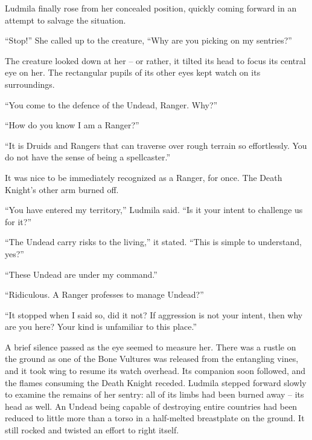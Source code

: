  

Ludmila finally rose from her concealed position, quickly coming forward in an attempt to salvage the situation.

 

“Stop!” She called up to the creature, “Why are you picking on my sentries?”

 

The creature looked down at her – or rather, it tilted its head to focus its central eye on her. The rectangular pupils of its other eyes kept watch on its surroundings.

 

“You come to the defence of the Undead, Ranger. Why?”

 

“How do you know I am a Ranger?”

 

“It is Druids and Rangers that can traverse over rough terrain so effortlessly. You do not have the sense of being a spellcaster.”

 

It was nice to be immediately recognized as a Ranger, for once. The Death Knight’s other arm burned off.

 

“You have entered my territory,” Ludmila said. “Is it your intent to challenge us for it?”

 

“The Undead carry risks to the living,” it stated. “This is simple to understand, yes?”

 

“These Undead are under my command.”

 

“Ridiculous. A Ranger professes to manage Undead?”

 

“It stopped when I said so, did it not? If aggression is not your intent, then why are you here? Your kind is unfamiliar to this place.”

 

A brief silence passed as the eye seemed to measure her. There was a rustle on the ground as one of the Bone Vultures was released from the entangling vines, and it took wing to resume its watch overhead. Its companion soon followed, and the flames consuming the Death Knight receded. Ludmila stepped forward slowly to examine the remains of her sentry: all of its limbs had been burned away – its head as well. An Undead being capable of destroying entire countries had been reduced to little more than a torso in a half-melted breastplate on the ground. It still rocked and twisted an effort to right itself.

